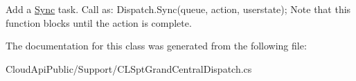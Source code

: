 Add a \hyperlink{namespace_cloud_api_public_1_1_sync}{Sync} task. Call as\-: Dispatch.\-Sync(queue, action, userstate); Note that this function blocks until the action is complete. 



The documentation for this class was generated from the following file\-:\begin{DoxyCompactItemize}
\item 
Cloud\-Api\-Public/\-Support/C\-L\-Spt\-Grand\-Central\-Dispatch.\-cs\end{DoxyCompactItemize}
